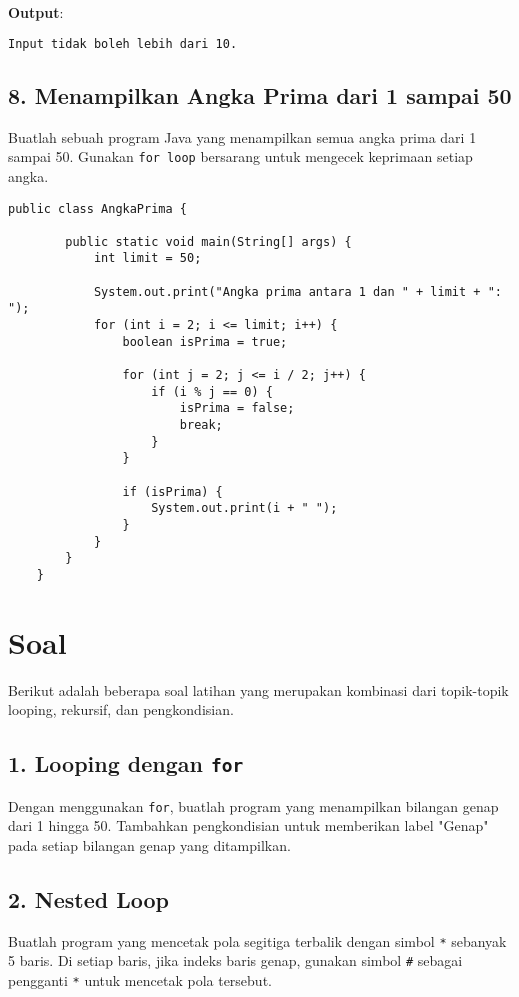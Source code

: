 \textbf{Output}:
\begin{lstlisting}[language=bash]
	Input tidak boleh lebih dari 10.
\end{lstlisting}


\subsection{8. Menampilkan Angka Prima dari 1 sampai 50}

Buatlah sebuah program Java yang menampilkan semua angka prima dari 1 sampai 50. Gunakan \texttt{for loop} bersarang untuk mengecek keprimaan setiap angka.

\begin{lstlisting}[style=JavaStyle]
	public class AngkaPrima {
		
		public static void main(String[] args) {
			int limit = 50;
			
			System.out.print("Angka prima antara 1 dan " + limit + ": ");
			for (int i = 2; i <= limit; i++) {
				boolean isPrima = true;
				
				for (int j = 2; j <= i / 2; j++) {
					if (i % j == 0) {
						isPrima = false;
						break;
					}
				}
				
				if (isPrima) {
					System.out.print(i + " ");
				}
			}
		}
	}
\end{lstlisting}


\section{Soal}

Berikut adalah beberapa soal latihan yang merupakan kombinasi dari topik-topik looping, rekursif, dan pengkondisian.

\subsection*{1. Looping dengan \texttt{for}}
Dengan menggunakan \texttt{for}, buatlah program yang menampilkan bilangan genap dari 1 hingga 50. Tambahkan pengkondisian untuk memberikan label "Genap" pada setiap bilangan genap yang ditampilkan.

\subsection*{2. Nested Loop}
Buatlah program yang mencetak pola segitiga terbalik dengan simbol \texttt{*} sebanyak 5 baris. Di setiap baris, jika indeks baris genap, gunakan simbol \texttt{\#} sebagai pengganti \texttt{*} untuk mencetak pola tersebut.

